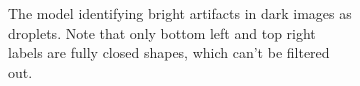 \begin{figure}[htbp]
    \centering
    \begin{subfigure}{\textwidth}
        \caption{The model identifying bright artifacts in dark images as droplets. Note that only bottom left and top right labels are fully closed shapes, which can't be filtered out.}
        \label{fig:totally_wrong_a}
    \end{subfigure}
    \begin{subfigure}{\textwidth}
\end{subfigure}
\end{figure}

